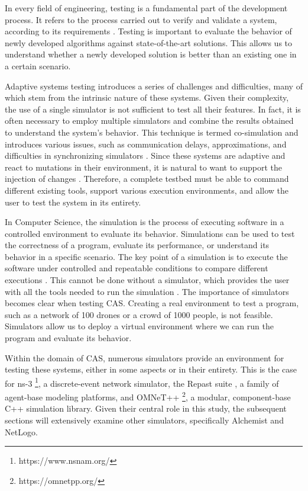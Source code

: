 \documentclass[12pt,a4paper,openright,twoside]{book}
\begin{document}
In every field of engineering, testing is a fundamental part of the development process. 
It refers to the process carried out to verify and validate a system, according to its requirements \cite{Spillner2011}.
Testing is important to evaluate the behavior of newly developed algorithms against state-of-the-art solutions.
This allows us to understand whether a newly developed solution is better than an existing one in a certain scenario.

Adaptive systems testing introduces a series of challenges and difficulties, many of which stem from the intrinsic nature of these systems.
Given their complexity, the use of a single simulator is not sufficient to test all their features.
In fact, it is often necessary to employ multiple simulators and combine the results obtained to understand the system's behavior.
This technique is termed co-simulation and introduces various issues, such as communication delays, approximations, and difficulties in synchronizing simulators \cite{DBLP:journals/simpra/ThuleLGML19}.
Since these systems are adaptive and react to mutations in their environment, it is natural to want to support the injection of changes \cite{DBLP:conf/icac/BrownHHLLSY04}.
Therefore, a complete testbed must be able to command different existing tools, support various execution environments, and allow the user to test the system in its entirety.

In Computer Science, the simulation is the process of executing software in a controlled environment to evaluate its behavior.
Simulations can be used to test the correctness of a program, evaluate its performance, or understand its behavior in a specific scenario.
The key point of a simulation is to execute the software under controlled and repeatable conditions to compare different executions  \cite{DBLP:journals/cacm/CollbergP16}.
This cannot be done without a simulator, which provides the user with all the tools needed to run the simulation  \cite{argun2021simulation, bagrodia1998parsec}.
The importance of simulators becomes clear when testing \ac{CAS}.
Creating a real environment to test a program, such as a network of 100 drones or a crowd of 1000 people, is not feasible.
Simulators allow us to deploy a virtual environment where we can run the program and evaluate its behavior.

Within the domain of \ac*{CAS}, numerous simulators provide an environment for testing these systems, either in some aspects or in their entirety.
This is the case for ns-3 \footnote{https://www.nsnam.org/}, a discrete-event network simulator, the Repast suite \cite{North2013}, a family of agent-base modeling platforms, and OMNeT++ \footnote{https://omnetpp.org/}, a modular, component-base C++ simulation library.
Given their central role in this study, the subsequent sections will extensively examine other simulators, specifically Alchemist and NetLogo.
\end{document}
